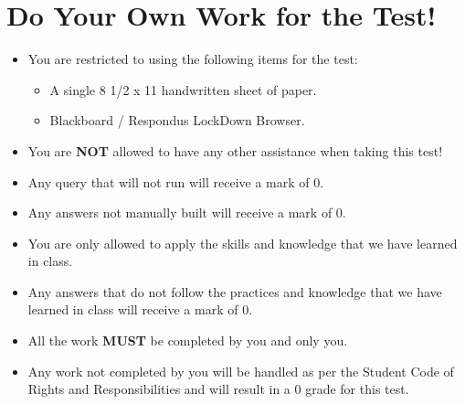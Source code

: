 \documentclass[12pt]{article}
\begin{document}
\section*{Do Your Own Work for the Test!}
\begin{itemize}
    \item You are restricted to using the following items for the test:
    \begin{itemize}
        \item A single 8 1/2 x 11 handwritten sheet of paper.
        \item Blackboard / Respondus LockDown Browser.
    \end{itemize}
    \item You are \textbf{NOT} allowed to have any other assistance when taking this test!
    \item Any query that will not run will receive a mark of 0.
    \item Any answers not manually built will receive a mark of 0.
    \item You are only allowed to apply the skills and knowledge that we have learned in class.
    \item Any answers that do not follow the practices and knowledge that we have learned in class will receive a mark of 0.
    \item All the work \textbf{MUST} be completed by you and only you.
    \item Any work not completed by you will be handled as per the Student Code of Rights and Responsibilities and will result in a 0 grade for this test.
\end{itemize}
\end{document}
